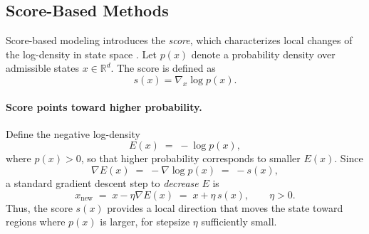 \documentclass[letterpaper]{article} %
\def\Eqref#1{Equation~\ref{#1}}
\providecommand{\Eqref}[1]{\Cref{#1}}
\begin{document}


\subsection{Score-Based Methods}\label{sec:score_corrections}

Score-based modeling introduces the \emph{score}, which characterizes local changes of the
log-density in state space \citep{Hyvarinen2005ScoreMatching}. Let $p(x)$ denote a probability density over admissible states
$x\in\mathbb{R}^d$. The score is defined as
\begin{equation}\label{eq:score_def}
s(x) = \nabla_x \log p(x).
\end{equation}

\paragraph{Score points toward higher probability.}
Define the negative log-density
\begin{equation}\label{eq:energy_def}
E(x) \;=\; -\log p(x),
\end{equation}
where $p(x) > 0$, so that higher probability corresponds to smaller $E(x)$. Since
\begin{equation}\label{eq:grad_energy}
\nabla E(x) \;=\; -\nabla \log p(x) \;=\; -s(x),
\end{equation}
a standard gradient descent step to \emph{decrease} $E$ is
\begin{equation}\label{eq:gd_energy}
x_{\text{new}} \;=\; x - \eta \nabla E(x) \;=\; x + \eta\, s(x), \qquad \eta>0.
\end{equation}
Thus, the score $s(x)$ provides a local direction that moves the state toward regions where $p(x)$ is larger, for stepsize $\eta$ sufficiently small.
\end{document}
